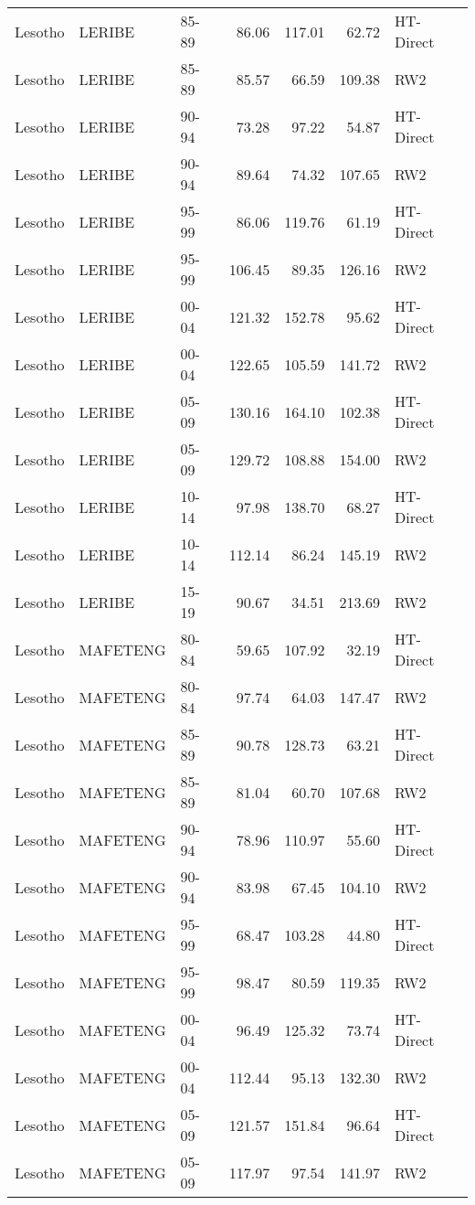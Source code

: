 \begin{longtable}{lllrrrl}
  Lesotho & LERIBE & 85-89 & 86.06 & 117.01 & 62.72 & HT-Direct \\ 
  Lesotho & LERIBE & 85-89 & 85.57 & 66.59 & 109.38 & RW2 \\ 
  Lesotho & LERIBE & 90-94 & 73.28 & 97.22 & 54.87 & HT-Direct \\ 
  Lesotho & LERIBE & 90-94 & 89.64 & 74.32 & 107.65 & RW2 \\ 
  Lesotho & LERIBE & 95-99 & 86.06 & 119.76 & 61.19 & HT-Direct \\ 
  Lesotho & LERIBE & 95-99 & 106.45 & 89.35 & 126.16 & RW2 \\ 
  Lesotho & LERIBE & 00-04 & 121.32 & 152.78 & 95.62 & HT-Direct \\ 
  Lesotho & LERIBE & 00-04 & 122.65 & 105.59 & 141.72 & RW2 \\ 
  Lesotho & LERIBE & 05-09 & 130.16 & 164.10 & 102.38 & HT-Direct \\ 
  Lesotho & LERIBE & 05-09 & 129.72 & 108.88 & 154.00 & RW2 \\ 
  Lesotho & LERIBE & 10-14 & 97.98 & 138.70 & 68.27 & HT-Direct \\ 
  Lesotho & LERIBE & 10-14 & 112.14 & 86.24 & 145.19 & RW2 \\ 
  Lesotho & LERIBE & 15-19 & 90.67 & 34.51 & 213.69 & RW2 \\ 
  Lesotho & MAFETENG & 80-84 & 59.65 & 107.92 & 32.19 & HT-Direct \\ 
  Lesotho & MAFETENG & 80-84 & 97.74 & 64.03 & 147.47 & RW2 \\ 
  Lesotho & MAFETENG & 85-89 & 90.78 & 128.73 & 63.21 & HT-Direct \\ 
  Lesotho & MAFETENG & 85-89 & 81.04 & 60.70 & 107.68 & RW2 \\ 
  Lesotho & MAFETENG & 90-94 & 78.96 & 110.97 & 55.60 & HT-Direct \\ 
  Lesotho & MAFETENG & 90-94 & 83.98 & 67.45 & 104.10 & RW2 \\ 
  Lesotho & MAFETENG & 95-99 & 68.47 & 103.28 & 44.80 & HT-Direct \\ 
  Lesotho & MAFETENG & 95-99 & 98.47 & 80.59 & 119.35 & RW2 \\ 
  Lesotho & MAFETENG & 00-04 & 96.49 & 125.32 & 73.74 & HT-Direct \\ 
  Lesotho & MAFETENG & 00-04 & 112.44 & 95.13 & 132.30 & RW2 \\ 
  Lesotho & MAFETENG & 05-09 & 121.57 & 151.84 & 96.64 & HT-Direct \\ 
  Lesotho & MAFETENG & 05-09 & 117.97 & 97.54 & 141.97 & RW2 \\ 

\end{longtable}
